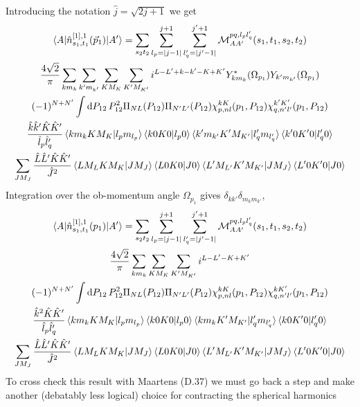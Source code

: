 \documentclass[10pt]{article}
\begin{document}
Introducing the notation $\hat{j} = \sqrt{2 j + 1}$ we get
\begin{multline*}
\braket{ A | \hat{n}_{s_1,t_1}^{[1],1}(\vec{p}_1) | A'} = \sum_{s_2 t_2}  
\sum_{l_p = |j-1|}^{j+1} \sum_{l_q' = |j' - 1|}^{j'+1} \mathcal{M}_{AA'}^{p 
q,l_p l_q'}(s_1,t_1,s_2,t_2) \\
 \frac{ 4 \sqrt{2}}{\pi} \sum_{k m_k} \sum_{k' m_{k'}} \sum_{K M_K} \sum_{K' 
M_{K'}} i^{L-L'+k-k'-K+K'} Y_{k m_k}^{*}(\Omega_{p_1}) Y_{k' 
m_{k'}}(\Omega_{p_1}) \\
 (-1)^{N+N'} \int \text{d} P_{12} \, P_{12}^{2} \Pi_{N L}(P_{12}) \Pi_{N' 
L'}(P_{12}) \chi_{p,nl}^{kK}(p_1,P_{12}) 
\chi_{q,n'l'}^{k'K'}(p_1,P_{12}) \\
     \frac{ \hat{k} \hat{k}' \hat{K} \hat{K}' }{ \hat{l}_p \hat{l}_{q}'} 
\braket{ k m_k K M_K | l_p m_{l_p}} \braket{ k 0 K 0 | l_p 0} \braket{ k' 
m_{k'} K' M_{K'} | l_q' m_{l_q'}} \braket{ k' 0 K' 0 | l_q' 0} \\
    \sum_{J M_J} \frac{ \hat{L} \hat{L}' \hat{K} \hat{K}' }{\hat{J}^{2}} 
\braket{ L M_L K M_K | J M_J} \braket{ L 0 K 0 | J 0 } \braket{L' M_{L'} K' 
M_{K'} | J M_J } \braket{ L' 0 K' 0 | J 0 } \\ 
\end{multline*}
Integration over the ob-momentum angle $\Omega_{p_1}$ gives $ \delta_{k k'} 
\delta_{m_k m_{k'}}$,
\begin{multline*}
\braket{ A | \hat{n}_{s_1,t_1}^{[1],1}(p_1) | A'} = \sum_{s_2 t_2}  \sum_{l_p = 
|j-1|}^{j+1} \sum_{l_q' = |j' - 1|}^{j'+1} \mathcal{M}_{AA'}^{p q,l_p 
l_q'}(s_1,t_1,s_2,t_2) \\
 \frac{ 4 \sqrt{2}}{\pi} \sum_{k m_k} \sum_{K M_K} \sum_{K' M_{K'}} 
i^{L-L'-K+K'} \\
 (-1)^{N+N'} \int \text{d} P_{12} \, P_{12}^{2} \Pi_{N L}(P_{12}) \Pi_{N' 
L'}(P_{12}) \chi_{p,nl}^{kK}(p_1,P_{12}) \chi_{q,n'l'}^{k 
K'}(p_1,P_{12}) \\
     \frac{ \hat{k}^{2} \hat{K} \hat{K}' }{ \hat{l}_p \hat{l}_{q}'} \braket{ k 
m_k K M_K | l_p m_{l_p}} \braket{ k 0 K 0 | l_p 0} \braket{ k m_k K' M_{K'} | 
l_q' m_{l_q'}} \braket{ k 0 K' 0 | l_q' 0} \\
    \sum_{J M_J} \frac{ \hat{L} \hat{L}' \hat{K} \hat{K}' }{\hat{J}^{2}} 
\braket{ L M_L K M_K | J M_J} \braket{ L 0 K 0 | J 0 } \braket{L' M_{L'} K' 
M_{K'} | J M_J } \braket{ L' 0 K' 0 | J 0 }
    \label{eq:ob_mat_el}
\end{multline*}
To cross check this result with Maartens (D.37) we must go back a step and make 
another (debatably less logical) choice for contracting the spherical harmonics 
\end{document}
